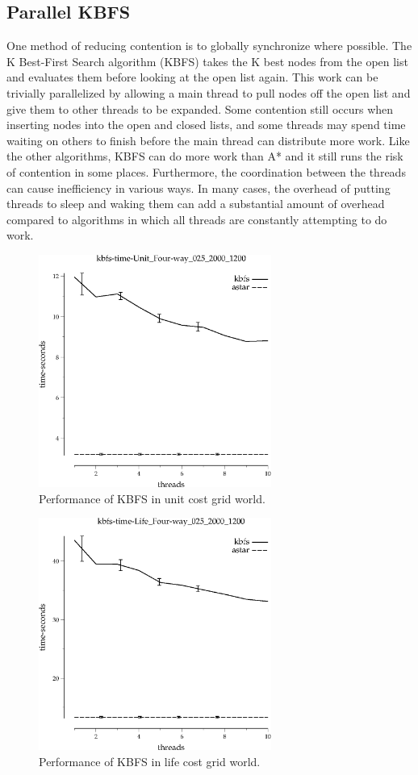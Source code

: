 \documentclass{article}
\begin{document}
\subsection{Parallel KBFS}
One method of reducing contention is to globally synchronize where possible. The K Best-First Search algorithm (KBFS) takes the K best nodes from the open list and evaluates them before looking at the open list again. This work can be trivially parallelized by allowing a main thread to pull nodes off the open list and give them to other threads to be expanded. Some contention still occurs when inserting nodes into the open and closed lists, and some threads may spend time waiting on others to finish before the main thread can distribute more work. Like the other algorithms, KBFS can do more work than A* and it still runs the risk of contention in some places. Furthermore, the coordination between the threads can cause inefficiency in various ways. In many cases, the overhead of putting threads to sleep and waking them can add a substantial amount of overhead compared to algorithms in which all threads are constantly attempting to do work.

\begin{figure}[h!]
\includegraphics[width=3in]{../graphs/seth/grid-unit-single/KBFS.eps}
\caption{Performance of KBFS in unit cost grid world.}
\label{fig:KBFS-grid}
\end{figure}

\begin{figure}[h!]
\includegraphics[width=3in]{../graphs/seth/grid-life-single/KBFS.eps}
\caption{Performance of KBFS in life cost grid world.}
\label{fig:KBFS-life}
\end{figure}
\end{document}
